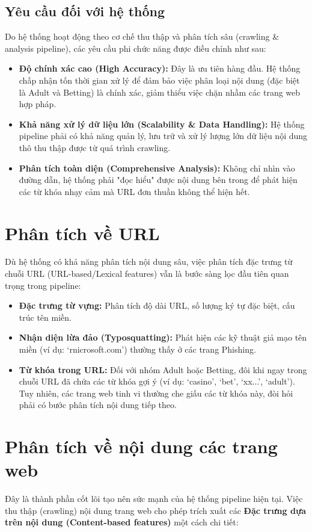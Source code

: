\documentclass[a4paper,12pt]{report}
\begin{document}
\subsection{Yêu cầu đối với hệ thống}
Do hệ thống hoạt động theo cơ chế thu thập và phân tích sâu (crawling \& analysis pipeline), các yêu cầu phi chức năng được điều chỉnh như sau:
\begin{itemize}
    \item \textbf{Độ chính xác cao (High Accuracy):} Đây là ưu tiên hàng đầu. Hệ thống chấp nhận tốn thời gian xử lý để đảm bảo việc phân loại nội dung (đặc biệt là Adult và Betting) là chính xác, giảm thiểu việc chặn nhầm các trang web hợp pháp.
    \item \textbf{Khả năng xử lý dữ liệu lớn (Scalability \& Data Handling):} Hệ thống pipeline phải có khả năng quản lý, lưu trữ và xử lý lượng lớn dữ liệu nội dung thô thu thập được từ quá trình crawling.
    \item \textbf{Phân tích toàn diện (Comprehensive Analysis):} Không chỉ nhìn vào đường dẫn, hệ thống phải "đọc hiểu" được nội dung bên trong để phát hiện các từ khóa nhạy cảm mà URL đơn thuần không thể hiện hết.
\end{itemize}

\section{Phân tích về URL}
Dù hệ thống có khả năng phân tích nội dung sâu, việc phân tích đặc trưng từ chuỗi URL (URL-based/Lexical features) vẫn là bước sàng lọc đầu tiên quan trọng trong pipeline:
\begin{itemize}
    \item \textbf{Đặc trưng từ vựng:} Phân tích độ dài URL, số lượng ký tự đặc biệt, cấu trúc tên miền.
    \item \textbf{Nhận diện lừa đảo (Typosquatting):} Phát hiện các kỹ thuật giả mạo tên miền (ví dụ: `rnicrosoft.com') thường thấy ở các trang Phishing.
    \item \textbf{Từ khóa trong URL:} Đối với nhóm Adult hoặc Betting, đôi khi ngay trong chuỗi URL đã chứa các từ khóa gợi ý (ví dụ: `casino', `bet', `xx...', `adult'). Tuy nhiên, các trang web tinh vi thường che giấu các từ khóa này, đòi hỏi phải có bước phân tích nội dung tiếp theo.
\end{itemize}

\section{Phân tích về nội dung các trang web}
Đây là thành phần cốt lõi tạo nên sức mạnh của hệ thống pipeline hiện tại. Việc thu thập (crawling) nội dung trang web cho phép trích xuất các \textbf{Đặc trưng dựa trên nội dung (Content-based features)} một cách chi tiết:
\end{document}

